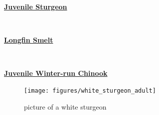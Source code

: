 \documentclass[
]{book}
\begin{document}
\begin{panel-grid}

\begin{columns-nocenter}

\begin{column800}

\textbf{\href{http://calfish.ucdavis.edu/species/?uid=182\&ds=698}{Juvenile Sturgeon}}

\end{column800}

\begin{column40}

~

\end{column40}

\begin{column800}

\textbf{\href{http://calfish.ucdavis.edu/species/?uid=87\&ds=698}{Longfin Smelt}}

\end{column800}

\begin{column40}

~

\end{column40}

\begin{column800}

\textbf{\href{http://calfish.ucdavis.edu/species/?uid=30\&ds=698}{Juvenile Winter-run Chinook}}

\end{column800}

\end{columns-nocenter}

\begin{columns-nocenter}

\begin{column800}

\begin{figure}

{\centering \texttt{[image: figures/white\_sturgeon\_adult]} 

}

\caption{picture of a white sturgeon}\label{fig:unnamed-chunk-170}
\end{figure}

\end{column800}

\begin{column40}

~


\end{column40}
\end{columns-nocenter}
\end{panel-grid}
\end{document}

